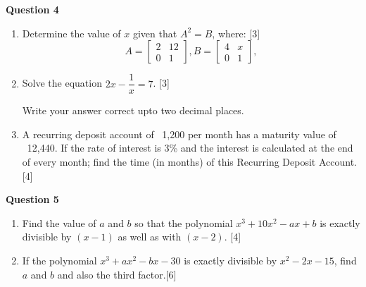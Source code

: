 \noindent
\textbf{Question 4}
\begin{enumerate}[label=(\roman*)]

    \item Determine the value of $x$ given that $A^2 = B$, where: \hfill [3]
        \[
            A = \begin{bmatrix*} 2 & 12 \\ 0 & 1 \end{bmatrix*}, 
            B = \begin{bmatrix*} 4 & x \\ 0 & 1 \end{bmatrix*}, 
        \]

    \item Solve the equation $2x - \dfrac{1}{x} = 7$. \hfill [3]
        
        Write your answer correct upto two decimal places. 

    \item A recurring deposit account of \rupee~1,200 per month has a 
        maturity value of \rupee~12,440. If the rate of interest is 3\%
        and the interest is calculated at the end of every month; find 
        the time (in months) of this Recurring Deposit Account. \hfill [4]

\end{enumerate}

\noindent
\textbf{Question 5}
\begin{enumerate}[label=(\roman*)]

    \item Find the value of $a$ and $b$ so that the polynomial 
        $x^3 + 10x^2 - ax + b$ is exactly divisible by $(x-1)$
        as well as with $(x-2)$. \hfill [4]

    \item If the polynomial $x^3 + ax^2 - bx - 30$ is exactly divisible
        by $x^2 - 2x - 15$, find $a$ and $b$ and also the third factor.\hfill [6]

\end{enumerate}


